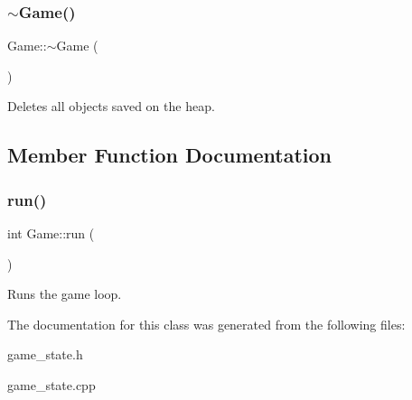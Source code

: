 \subsubsection{\texorpdfstring{$\sim$\+Game()}{~Game()}}
{\footnotesize\ttfamily Game\+::$\sim$\+Game (\begin{DoxyParamCaption}{ }\end{DoxyParamCaption})}

Deletes all objects saved on the heap. 

\subsection{Member Function Documentation}
\mbox{\label{classGame_a99fb161fbbe87d25a8b73265a0611e58}} 
\subsubsection{\texorpdfstring{run()}{run()}}
{\footnotesize\ttfamily int Game\+::run (\begin{DoxyParamCaption}{ }\end{DoxyParamCaption})}

Runs the game loop. 

The documentation for this class was generated from the following files\+:\begin{DoxyCompactItemize}
\item 
game\+\_\+state.\+h\item 
game\+\_\+state.\+cpp\end{DoxyCompactItemize}
